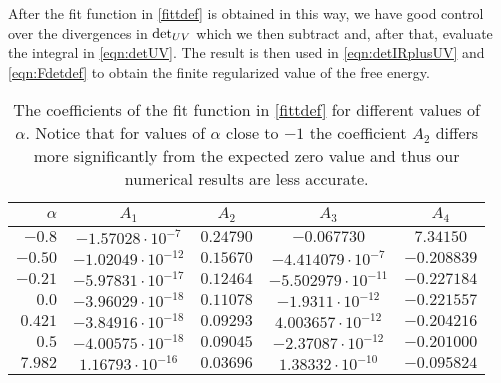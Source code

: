 \documentclass[12pt]{article}
\numberwithin{equation}{section}
\begin{document}
After the fit function in \eqref{fittdef} is obtained in this way, we have good control over the divergences in ${\rm det}_{UV}$ which we then subtract and, after that, evaluate the integral in \eqref{eqn:detUV}. The result is then used in \eqref{eqn:detIRplusUV} and \eqref{eqn:Fdetdef} to obtain the finite regularized value of the free energy.
%
\begin{table*}
  \centering
  \begin{tabular}{r||c|c|c|c} 
   $\alpha$  &  $A_1$ & $A_2$  & $A_3$ & $A_4$   
   \\
    \hline \hline %
{$-0.8$} & {$-1.57028\cdot 10^{-7}$}&  {$0.24790$}&  {$-0.067730$} &  {$7.34150$} \\ \hline
$-0.50 $&  {$-1.02049\cdot10^{-12}$}&  {$0.15670$}&  {$-4.414079\cdot 10^{-7}$} &  {$ -0.208839$} \\ \hline
$-0.21 $&  {$-5.97831 \cdot 10^{-17}$}&  {$0.12464$}&  {$-5.502979\cdot 10^{-11}$} &  {$ -0.227184$}\\ \hline
$0.0 $&  {$-3.96029 \cdot 10^{-18}$}&  {$0.11078$}&  {$-1.9311 \cdot 10^{-12} $}&  {$ -0.221557$}\\ \hline
$0.421 $&  {$-3.84916 \cdot 10^{-18}$}&  {$0.09293$}&  {$4.003657 \cdot 10^{-12}$} &  {$ -0.204216$} \\ \hline
$0.5 $&  {$-4.00575 \cdot 10^{-18}$}&  {$0.09045$}&  {$-2.37087 \cdot 10^{-12}$} &  {$ -0.201000$}\\ \hline
$7.982 $&  {$1.16793 \cdot 10^{-16}$}&  {$0.03696$}&  {$1.38332 \cdot 10^{-10}$} &  {$ -0.095824$}  \end{tabular}
  \caption{The coefficients of the fit function in \eqref{fittdef} for different values of $\alpha$. Notice that for values of $\alpha$ close to $-1$ the coefficient $A_2$ differs more significantly from the expected zero value and thus our numerical results are less accurate.  }
\label{tbl:coeff}   
\end{table*}    
%
 


\renewcommand{\leftmark}{\MakeUppercase{Bibliography}}

%

\label{biblio}
  
\end{document}

